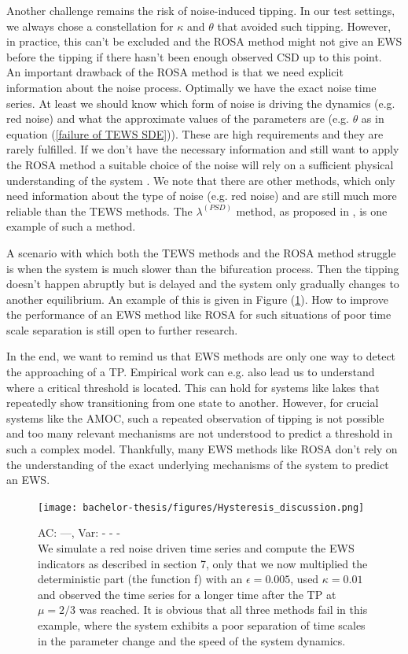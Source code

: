 \documentclass[%
thesis=student,%
coverpage=false,%
titlepage=false,%
headmarks=true, %
english,%
font=libertine, %
math=newpxtx, %
BCOR=5mm,%
coverBCOR=11mm%
]{tumbook}
\begin{document}
Another challenge remains the risk of noise-induced tipping. In our test settings, we always chose a constellation for $\kappa$ and $\theta$ that avoided such tipping. However, in practice, this can't be excluded and the ROSA method might not give an EWS before the tipping if there hasn't been enough observed CSD up to this point. \\
An important drawback of the ROSA method is that we need explicit information about the noise process. Optimally we have the exact noise time series. At least we should know which form of noise is driving the dynamics (e.g. red noise) and what the approximate values of the parameters are (e.g. $\theta$ as in 
equation (\ref{failure of TEWS SDE})). These are high requirements and they are rarely fulfilled. If we don't have the necessary information and still want to apply the ROSA method a suitable choice of the noise will rely on a sufficient physical understanding of the system \cite{Morr:2024}. We note that there are other methods, which only need information about the type of noise (e.g. red noise) and are still much more reliable than the TEWS methods. The $\lambda^{(PSD)}$ method, as proposed in \cite{Morr:2024}, is one example of such a method.

A scenario with which both the TEWS methods and the ROSA method struggle is when the system is much slower than the bifurcation process. Then the tipping doesn't happen abruptly but is delayed and the system only gradually changes to another equilibrium. An example of this is given in Figure (\ref{hysteresis_discussion}). How to improve the performance of an EWS method like ROSA for such situations of poor time scale separation is still open to further research.

In the end, we want to remind us that EWS methods are only one way to detect the approaching of a TP. Empirical work can e.g. also lead us to understand where a critical threshold is located. This can hold for systems like lakes that repeatedly show transitioning from one state to another. However, for crucial systems like the AMOC, such a repeated observation of tipping is not possible and too many relevant mechanisms are not understood to predict a threshold in such a complex model. Thankfully, many EWS methods like ROSA don't rely on the understanding of the exact underlying mechanisms of the system to predict an EWS.



\begin{figure}
    \centering
    \texttt{[image: bachelor-thesis/figures/Hysteresis\_discussion.png]}
    \caption{AC: ---, Var: - - - \\
    We simulate a red noise driven time series and compute the EWS indicators as described in section 7, only that we now multiplied the deterministic part (the function f) with an $\epsilon = 0.005$, used $\kappa = 0.01$ and observed the time series for a longer time after the TP at $\mu = 2/3$ was reached. It is obvious that all three methods fail in this example, where the system exhibits a poor separation of time scales in the parameter change and the speed of the system dynamics.
    }
    \label{hysteresis_discussion}
\end{figure}
\end{document}

